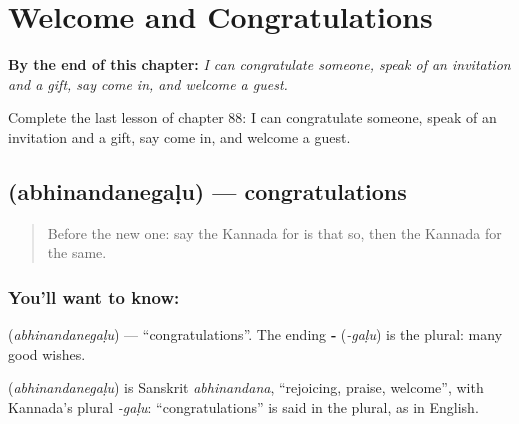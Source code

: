 
\chapter{Welcome and Congratulations}
\label{ch:ka-welcome-and-congratulations}

\begin{chapteropening}
\textbf{By the end of this chapter:} \emph{I can congratulate someone, speak of an invitation and a gift, say come in, and welcome a guest.}

Complete the last lesson of chapter 88: I can congratulate someone, speak of an invitation and a gift, say come in, and welcome a guest.
\end{chapteropening}

\section[\texorpdfstring{\kn{ಅಭಿನಂದನೆಗಳು} (abhinandanegaḷu)}{ಅಭಿನಂದನೆಗಳು (abhinandanegaḷu)}]{ (abhinandanegaḷu) — congratulations}

\label{lesson:KA-C88-congratulations}



\begin{quote}
Before the new one: say the Kannada for is that so, then the Kannada for the same.
\end{quote}

\subsection*{You'll want to know: }
\textbf{} (\emph{abhinandanegaḷu}) — \textquotedblleft{}congratulations\textquotedblright{}. The ending \textbf{‑} (\emph{-gaḷu}) is the plural: many good wishes.

\begin{cousinweb}
\textbf{} (\emph{abhinandanegaḷu}) is Sanskrit \emph{abhinandana}, \textquotedblleft{}rejoicing, praise, welcome\textquotedblright{}, with Kannada's plural \emph{-gaḷu}: \textquotedblleft{}congratulations\textquotedblright{} is said in the plural, as in English.
\end{cousinweb}

